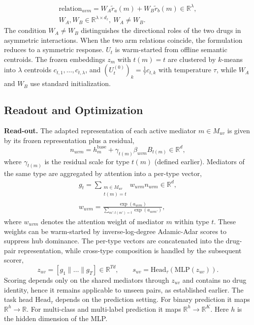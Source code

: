 \documentclass[letterpaper]{article} %
\begin{document}
\begin{equation}
\begin{array}{c}
\mathrm{relation}_{uvm} = W_A\tilde{r}_a(m) + W_B\tilde{r}_b(m)\in\mathbb{R}^{\lambda},\\
W_A,W_B\in\mathbb{R}^{\lambda\times d_z},\ W_A\neq W_B.
\end{array}
\end{equation}
The condition $W_A\neq W_B$ distinguishes the directional roles of the two drugs in asymmetric interactions. When the two arm relations coincide, the formulation reduces to a symmetric response. $U_t$ is warm-started from offline semantic centroids. The frozen embeddings $z_m$ with $t(m)=t$ are clustered by $k$-means into $\lambda$ centroids $c_{t,1},\dots,c_{t,\lambda}$, and $(U_t^{(0)})_k=\frac{1}{\tau}c_{t,k}$ with temperature $\tau$, while $W_A$ and $W_B$ use standard initialization.

\subsection{Readout and Optimization}

\textbf{Read-out.} The adapted representation of each active mediator $m\in M_{uv}$ is given by its frozen representation plus a residual,
\begin{equation}
n_{uvm} = h^{\mathrm{base}}_m + \gamma_{t(m)}\beta_{uvm}B_{t(m)}\in\mathbb{R}^{d},
\end{equation}
where $\gamma_{t(m)}$ is the residual scale for type $t(m)$ (defined earlier). Mediators of the same type are aggregated by attention into a per-type vector,
\begin{equation}
\begin{array}{c}
g_t = \sum_{\substack{m\in M_{uv}\\ t(m)=t}} w_{uvm}n_{uvm}\in\mathbb{R}^{d},\\
w_{uvm}=\frac{\exp(a_{uvm})}{\sum_{m':t(m')=t}\exp(a_{uvm'})},
\end{array}
\end{equation}
where $w_{uvm}$ denotes the attention weight of mediator $m$ within type $t$. These weights can be warm-started by inverse-log-degree Adamic-Adar scores to suppress hub dominance. The per-type vectors are concatenated into the drug-pair representation, while cross-type composition is handled by the subsequent scorer,
\begin{equation}
z_{uv} = [g_1\|\dots\|g_T]\in\mathbb{R}^{Td},\qquad
s_{uv} = \mathrm{Head}_\tau(\mathrm{MLP}(z_{uv})).
\end{equation}
Scoring depends only on the shared mediators through $z_{uv}$ and contains no drug identity, hence it remains applicable to unseen pairs, as established earlier. The task head $\mathrm{Head}_\tau$ depends on the prediction setting. For binary prediction it maps $\mathbb{R}^h\to\mathbb{R}$. For multi-class and multi-label prediction it maps $\mathbb{R}^h\to\mathbb{R}^K$. Here $h$ is the hidden dimension of the MLP.
\end{document}
